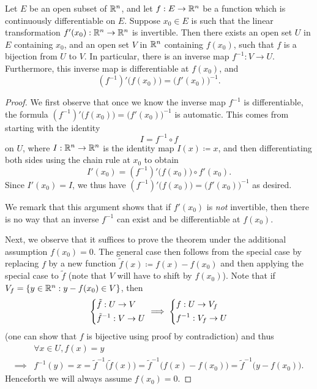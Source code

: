 \begin{thm}\label{6.7.2}
  Let \(E\) be an open subset of \(\mathbb{R}^n\), and let \(f : E \to \mathbb{R}^n\) be a function which is continuously differentiable on \(E\).
  Suppose \(x_0 \in E\) is such that the linear transformation \(f'(x_0) : \mathbb{R}^n \to \mathbb{R}^n\) is invertible.
  Then there exists an open set \(U\) in \(E\) containing \(x_0\), and an open set \(V\) in \(\mathbb{R}^n\) containing \(f(x_0)\), such that \(f\) is a bijection from \(U\) to \(V\).
  In particular, there is an inverse map \(f^{-1} : V \to U\).
  Furthermore, this inverse map is differentiable at \(f(x_0)\), and
  \[
    (f^{-1})' \big(f(x_0)\big) = \big(f'(x_0)\big)^{-1}.
  \]
\end{thm}

\begin{proof}
  We first observe that once we know the inverse map \(f^{-1}\) is differentiable, the formula \((f^{-1})' \big(f(x_0)\big) = \big(f'(x_0)\big)^{-1}\) is automatic.
  This comes from starting with the identity
  \[
    I = f^{-1} \circ f
  \]
  on \(U\), where \(I : \mathbb{R}^n \to \mathbb{R}^n\) is the identity map \(I(x) \coloneqq x\), and then differentiating both sides using the chain rule at \(x_0\) to obtain
  \[
    I'(x_0) = (f^{-1})' \big(f(x_0)\big) \circ f'(x_0).
  \]
  Since \(I'(x_0) = I\), we thus have \((f^{-1})' \big(f(x_0)\big) = \big(f'(x_0)\big)^{-1}\) as desired.

  We remark that this argument shows that if \(f'(x_0)\) is \emph{not} invertible, then there is no way that an inverse \(f^{-1}\) can exist and be differentiable at \(f(x_0)\).

  Next, we observe that it suffices to prove the theorem under the additional assumption \(f(x_0) = 0\).
  The general case then follows from the special case by replacing \(f\) by a new function \(\tilde{f}(x) \coloneqq f(x) - f(x_0)\) and then applying the special case to \(\tilde{f}\)
  (note that \(V\) will have to shift by \(f(x_0)\)).
  Note that if \(V_f = \{y \in \mathbb{R}^n : y - f(x_0) \in V\}\), then
  \[
    \begin{dcases}
      \tilde{f} : U \to V \\
      \tilde{f}^{-1} : V \to U
    \end{dcases} \implies \begin{dcases}
      f : U \to V_f \\
      f^{-1} : V_f \to U
    \end{dcases}
  \]
  (one can show that \(f\) is bijective using proof by contradiction)
  and thus
  \begin{align*}
             & \forall x \in U, f(x) = y                                                                                                          \\
    \implies & f^{-1}(y) = x = \tilde{f}^{-1}\big(\tilde{f}(x)\big) = \tilde{f}^{-1}\big(f(x) - f(x_0)\big) = \tilde{f}^{-1}\big(y - f(x_0)\big).
  \end{align*}
  Henceforth we will always assume \(f(x_0) = 0\).


\end{proof}
